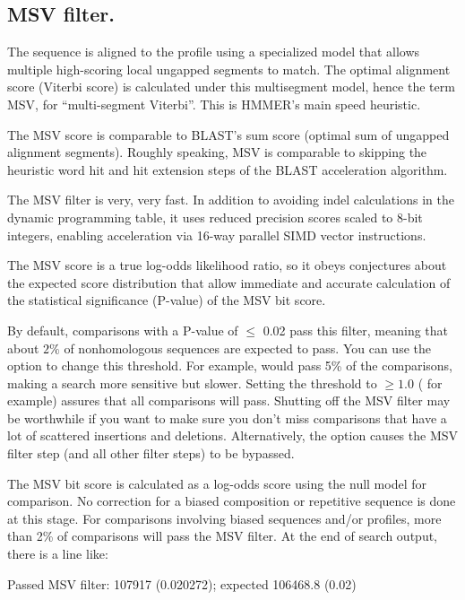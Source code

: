 \subsection{MSV filter.}

The sequence is aligned to the profile using a specialized model that
allows multiple high-scoring local ungapped segments to match.  The
optimal alignment score (Viterbi score) is calculated under this
multisegment model, hence the term MSV, for ``multi-segment
Viterbi''. This is HMMER's main speed heuristic.

The MSV score is comparable to BLAST's sum score (optimal sum of
ungapped alignment segments).  Roughly speaking, MSV is comparable to
skipping the heuristic word hit and hit extension steps of the BLAST
acceleration algorithm. 

The MSV filter is very, very fast. In addition to avoiding indel 
calculations in the dynamic programming table, it uses reduced precision
scores scaled to 8-bit integers, enabling acceleration via 16-way       
parallel SIMD vector instructions. 

The MSV score is a true log-odds likelihood ratio, so it obeys
conjectures about the expected score distribution \citep{Eddy08} that
allow immediate and accurate calculation of the statistical
significance (P-value) of the MSV bit score.

By default, comparisons with a P-value of $\leq$ 0.02 pass this
filter, meaning that about $2\%$ of nonhomologous sequences are
expected to pass. You can use the  option to change
this threshold. For example,  would pass 5\% of the
comparisons, making a search more sensitive but slower. Setting the
threshold to $\ge 1.0$ ( for example) assures that all
comparisons will pass. Shutting off the MSV filter may be worthwhile
if you want to make sure you don't miss comparisons that have a lot of
scattered insertions and deletions. Alternatively, the 
option causes the MSV filter step (and all other filter steps) to be
bypassed.

The MSV bit score is calculated as a log-odds score using the null
model for comparison. No correction for a biased composition or
repetitive sequence is done at this stage. For comparisons involving
biased sequences and/or profiles, more than 2\% of comparisons will
pass the MSV filter. At the end of search output, there is a line
like:

\begin{sreoutput}
 Passed MSV filter:                    107917  (0.020272); expected 106468.8 (0.02)
\end{sreoutput}

